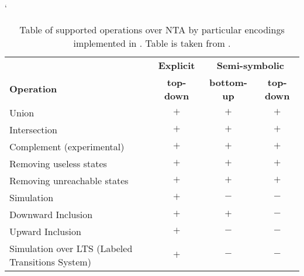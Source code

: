 \begin{table}[bt]
	\begin{center}
		\catcode`
		\begin{tabular}{| l | c | c | c |} \hline
		& {\textbf{Explicit}} & \multicolumn{2}{|c|}{\textbf{Semi-symbolic}} \\ \cline{2-4}
		\textbf{Operation} & \textbf{top-down} & \textbf{bottom-up} & \textbf{top-down} \\ \hline
		Union & $+$ & $+$ & $+$ \\
		Intersection & $+$ & $+$ & $+$ \\
		Complement (experimental) & $+$ & $+$ & $+$ \\
		Removing useless states & $+$ & $+$ & $+$ \\
		Removing unreachable states & $+$ & $+$ & $+$ \\
		Simulation & $+$ & $-$ & $-$ \\
		Downward Inclusion  & $+$ & $+$ & $-$ \\ 
		Upward Inclusion  & $+$ & $-$ & $-$ \\ 
		Simulation over LTS (Labeled Transitions System) & $+$ & $-$ & $-$ \\ \hline
		\end{tabular}
	\caption{Table of supported operations over NTA by particular encodings implemented in \vata.
	Table is taken from \cite{bt:hruska}.}
	\label{tab:vataop}
	\end{center}
\end{table}

